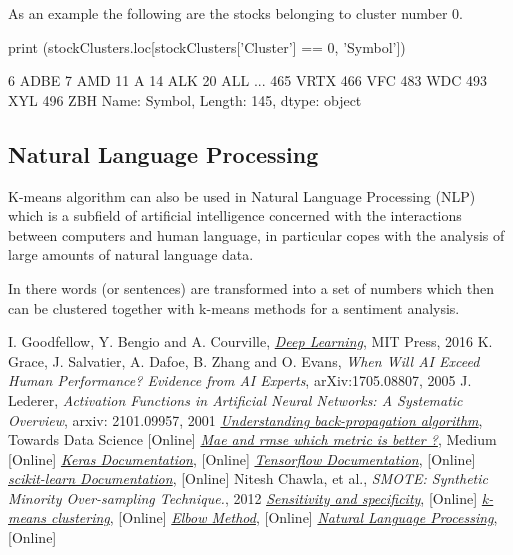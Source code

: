 As an example the following are the stocks belonging to cluster number 0.

\begin{ipython} 
print (stockClusters.loc[stockClusters['Cluster'] == 0, 'Symbol'])
\end{ipython}
\begin{ioutput}
6      ADBE
7       AMD
11        A
14      ALK
20      ALL
       ... 
465    VRTX
466     VFC
483     WDC
493     XYL
496     ZBH
Name: Symbol, Length: 145, dtype: object
\end{ioutput}

\subsection{Natural Language Processing}

K-means algorithm can also be used in Natural Language Processing (NLP)~\cite{bib:nlp} which is a subfield of artificial intelligence concerned with the interactions between computers and human language, in particular copes with the analysis of large amounts of natural language data.

In there words (or sentences) are transformed into a set of numbers which then can be clustered together with k-means methods for a sentiment analysis.
 
\begin{thebibliography}{9}
 I. Goodfellow, Y. Bengio and A. Courville, \href{http://www.deeplearningbook.org}{\emph{Deep Learning}}, MIT Press, 2016
K. Grace, J. Salvatier, A. Dafoe, B. Zhang and O. Evans, \emph{When Will AI Exceed Human Performance? Evidence from AI Experts}, arXiv:1705.08807, 2005
 J. Lederer, \emph{Activation Functions in Artificial Neural Networks: A Systematic Overview}, arxiv: 2101.09957, 2001
\href{https://towardsdatascience.com/understanding-backpropagation-algorithm-7bb3aa2f95fd}{\emph{Understanding back-propagation algorithm}}, Towards Data Science [Online]
\href{https://medium.com/human-in-a-machine-world/mae-and-rmse-which-metric-is-better-e60ac3bde13d}{\emph{Mae and rmse which metric is better ?}}, Medium [Online]
\href{https://keras.io/}{\emph{Keras Documentation}}, [Online]  
\href{https://www.tensorflow.org/}{\emph{Tensorflow Documentation}}, [Online] 
\href{https://scikit-learn.org/stable/}{\emph{scikit-learn Documentation}}, [Online]
Nitesh Chawla, et al., \emph{SMOTE: Synthetic Minority Over-sampling Technique.}, 2012
\href{https://en.wikipedia.org/wiki/Sensitivity_and_specificity}{\emph{Sensitivity and specificity}}, [Online]
\href{https://en.wikipedia.org/wiki/K-means_clustering}{\emph{k-means clustering}}, [Online]
\href{https://en.wikipedia.org/wiki/Elbow_method_(clustering)}{\emph{Elbow Method}}, [Online]
\href{https://www.ibm.com/cloud/learn/natural-language-processing}{\emph{Natural Language Processing}}, [Online]
\end{thebibliography}